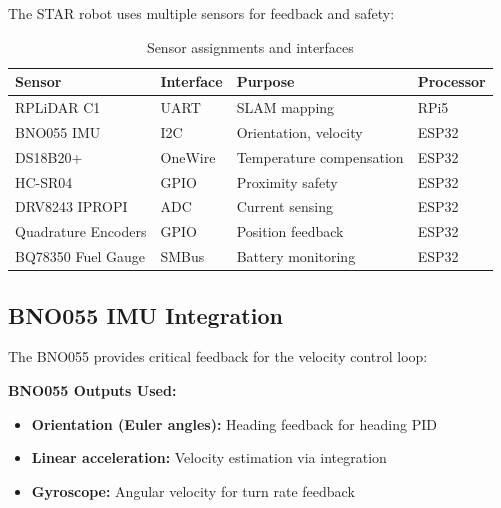 \documentclass[11pt,letterpaper]{article}
\begin{document}
The STAR robot uses multiple sensors for feedback and safety:

\begin{table}[H]
\centering
\begin{tabular}{@{}llll@{}}
\toprule
\textbf{Sensor} & \textbf{Interface} & \textbf{Purpose} & \textbf{Processor} \\
\midrule
RPLiDAR C1 & UART & SLAM mapping & RPi5 \\
BNO055 IMU & I2C & Orientation, velocity & ESP32 \\
DS18B20+ & OneWire & Temperature compensation & ESP32 \\
HC-SR04 & GPIO & Proximity safety & ESP32 \\
DRV8243 IPROPI & ADC & Current sensing & ESP32 \\
Quadrature Encoders & GPIO & Position feedback & ESP32 \\
BQ78350 Fuel Gauge & SMBus & Battery monitoring & ESP32 \\
\bottomrule
\end{tabular}
\caption{Sensor assignments and interfaces}
\end{table}

\subsection{BNO055 IMU Integration}

The BNO055 provides critical feedback for the velocity control loop:

\begin{center}
\end{center}

\textbf{BNO055 Outputs Used:}
\begin{itemize}
    \item \textbf{Orientation (Euler angles):} Heading feedback for heading PID
    \item \textbf{Linear acceleration:} Velocity estimation via integration
    \item \textbf{Gyroscope:} Angular velocity for turn rate feedback
\end{itemize}
\end{document}
